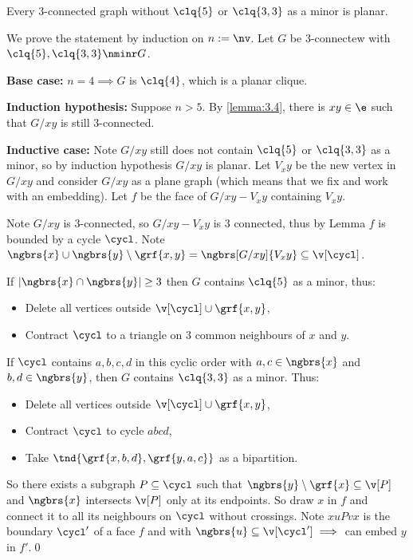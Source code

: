 \begin{customlemma}{4.16}
\label{lemma:4.16}
    Every $3$-connected graph without $\clq{5}$ or $\clq{3, 3}$ as a minor is planar.
\end{customlemma}
\begin{prf}
    We prove the statement by induction on $n := \nv$. Let $G$ be $3$-connectew with $\clq{5}, \clq{3, 3} \nminr G$.

    \textbf{Base case: } $n = 4 \implies G$ is $\clq{4}$, which is a planar clique. 
    
    \textbf{Induction hypothesis: }Suppose $n > 5$. By \ref{lemma:3.4}, there is $xy \in \e$ such that $G / xy$ is still $3$-connected. 
    
    \textbf{Inductive case: }Note $G / xy$ still does not contain $\clq{5}$ or $\clq{3, 3}$ as a minor, so by induction hypothesis $G / xy$ is planar. Let $V_xy$ be the new vertex in $G / xy$ and consider $G /xy$ as a plane graph (which means that we fix and work with an embedding). Let $f$ be the face of $G / xy - V_xy$ containing $V_xy$.

    Note $G / xy$ is $3$-connected, so $G / xy - V_xy$ is 3 connected, thus by Lemma $f$ is bounded by a cycle $\cycl$. Note $\ngbrs{x} \cup \ngbrs{y} \setminus \grf{x, y} = \ngbrs[G / xy]{V_xy} \subseteq \v[\cycl]$.

    If $|\ngbrs{x} \cap \ngbrs{y}| \geq 3$ then $G$ contains $\clq{5}$ as a minor, thus:
    \begin{itemize}
        \item Delete all vertices outside $\v[\cycl] \cup \grf{x, y}$,
        \item Contract $\cycl$ to a triangle on $3$ common neighbours of $x$ and $y$.
    \end{itemize}
    If $\cycl$ contains $a, b, c, d$ in this cyclic order with $a, c \in \ngbrs{x}$ and $b, d \in \ngbrs{y}$, then $G$ contains $\clq{3, 3}$ as a minor. Thus:
    \begin{itemize}
        \item Delete all vertices outside $\v[\cycl] \cup \grf{x, y}$,
        \item Contract $\cycl$ to cycle $abcd$,
        \item Take $\tnd{\grf{x, b, d}, \grf{y, a, c}}$ as a bipartition.
    \end{itemize}

    So there exists a subgraph $P \subseteq \cycl$ such that $\ngbrs{y} \setminus \grf{x} \subseteq \v[P]$ and $\ngbrs{x}$ intersects $\v[P]$ only at its endpoints. So draw $x$ in $f$ and connect it to all its neighbours on $\cycl$ without crossings. Note $xuPvx$ is the boundary $\cycl'$ of a face $f$ and with $\ngbrs{u} \subseteq \v[\cycl'] \implies$ can embed $y$ in $f'$.\qed
\end{prf}
